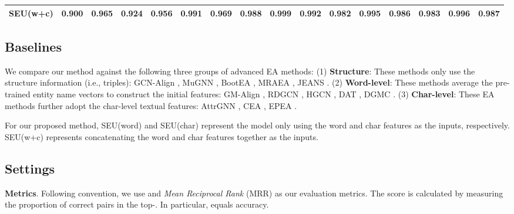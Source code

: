 \documentclass[11pt]{article}
\begin{document}
\begin{table*}[t]
\begin{center}
{\begin{tabular}{c|ccc|ccc|ccc|ccc|ccc}
   SEU(w+c)&\textbf{0.900}&\textbf{0.965}&\textbf{0.924}&\textbf{0.956}&\textbf{0.991}&\textbf{0.969}&\textbf{0.988}&\textbf{0.999}&\textbf{0.992}&\textbf{0.982}&\textbf{0.995}&\textbf{0.986}&\textbf{0.983}&\textbf{0.996}&\textbf{0.987}\\
  \bottomrule
\end{tabular}
}
\caption{Main experimental results on DBPK and SRPRS. Baselines are separated in accord with the three groups described in Section \ref{baseline}. Most results are from the original papers.
Some recent papers are failed to run on missing datasets or do not release the source code yet. We will fill in these blanks after contacting their authors.}
\label{table:res1}
\vspace{-2em}
\end{center}
\end{table*}


\subsection{Baselines}
\label{baseline}
We compare our method against the following three groups of advanced EA methods:
(1) \textbf{Structure}:
These methods only use the structure information (i.e., triples):
GCN-Align \cite{DBLP:conf/emnlp/WangLLZ18}, MuGNN \cite{DBLP:conf/acl/CaoLLLLC19}, BootEA \cite{DBLP:conf/ijcai/SunHZQ18}, MRAEA \cite{DBLP:conf/wsdm/MaoWXLW20}, JEANS \cite{DBLP:conf/eacl/ChenSZR21}.
(2) \textbf{Word-level}:
These methods average the pre-trained entity name vectors to construct the initial features:
GM-Align \cite{DBLP:conf/acl/XuWYFSWY19}, RDGCN \cite{DBLP:conf/ijcai/WuLF0Y019}, HGCN \cite{DBLP:conf/emnlp/WuLFWZ19}, DAT \cite{DBLP:conf/sigir/Zeng00TT20}, DGMC \cite{DBLP:conf/iclr/FeyL0MK20}.
(3) \textbf{Char-level}:
These EA methods further adopt the char-level textual features:
AttrGNN \cite{DBLP:conf/emnlp/LiuCPLC20}, CEA \cite{DBLP:conf/icde/Zeng0T020}, EPEA \cite{DBLP:conf/emnlp/WangYY20}.

For our proposed method, SEU(word) and SEU(char) represent the model only using the word and char features as the inputs, respectively.
SEU(w+c) represents concatenating the word and char features together as the inputs.

\subsection{Settings}
\textbf{Metrics}.
Following convention, we use  and \emph{Mean Reciprocal Rank} (MRR) as our evaluation metrics.
The  score is calculated by measuring the proportion of correct pairs in the top-.
In particular,  equals accuracy.
\end{document}
